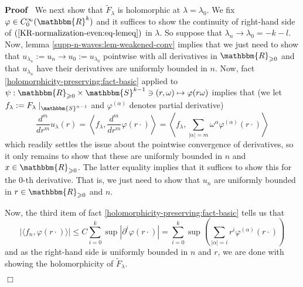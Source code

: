 \documentclass[12pt]{article}
\newcommand{\assign}{:=}
\renewenvironment{proof}{\noindent\textbf{Proof\ }}{\hspace*{\fill}$\Box$\medskip}
\theoremstyle{remark}
\begin{document}
\begin{proof}
  We next show that $\tilde{F}_{\lambda}$ is holomorphic at $\lambda =
  \lambda_0$. We fix $\varphi \in C^{\infty}_0 (\mathbbm{R}^k)$ and it
  suffices to show the continuity of right-hand side of
  $(\ref{KR-normalization-even:eq-lemeq})$ in $\lambda$. So suppose that
  $\lambda_n \rightarrow \lambda_0 = - k - l$. Now, lemma
  \ref{supp-n-waves:lem-weakened-conv} implies that we just need to show that
  $u_{\lambda_n} \assign u_n \rightarrow u_0 \assign u_{\lambda_0}$ pointwise
  with all derivatives in $\mathbbm{R}_{\geqslant 0}$ and that $u_{\lambda_n}$
  have their derivatives are uniformly bounded in $n$. Now, fact
  \ref{holomorphicity-preserving:fact-basic} applied to $\psi :
  \mathbbm{R}_{\geqslant 0} \times \mathbbm{S}^{k - 1} \ni (r, \omega) \mapsto
  \varphi (r \omega)$ implies that (we let $f_{\lambda} \assign F_{\lambda}
  \mid_{\mathbbm{S}^{n - 1}}$ and $\varphi^{(\alpha)}$ denotes partial
  derivative)
  \[ \frac{d^m}{d r^m} u_{\lambda} (r) = \left\langle f_{\lambda},
     \frac{d^m}{d r^m} \varphi (r \cdot) \right\rangle = \left\langle
     f_{\lambda}, \sum_{| \alpha | = m} \omega^{\alpha} \varphi^{(\alpha)} (r
     \cdot) \right\rangle \]
  which readily settles the issue about the pointwise convergence of
  derivatives, so it only remains to show that these are uniformly bounded in
  $n$ and $x \in \mathbbm{R}_{\geqslant 0}$. The latter equality implies that
  it suffices to show this for the 0-th derivative. That is, we just need to
  show that $u_n$ are uniformly bounded in $r \in \mathbbm{R}_{\geqslant 0}$
  and $n$.
  
  Now, the third item of fact \ref{holomorphicity-preserving:fact-basic} tells
  us that
  \[ | \langle f_n, \varphi (r \cdot) \rangle | \leqslant C \sum_{i = 0}^k
     \sup | \partial^i \varphi (r \cdot) | = \sum_{i = 0}^k \sup \left(
     \sum_{| \alpha | = i} r^i \varphi^{(\alpha)} (r \cdot) \right) \]
  and as the right-hand side is uniformly bounded in $n$ and $r$, we are done
  with showing the holomorphicity of $\tilde{F}_{\lambda}$.
  

\end{proof}
\end{document}
